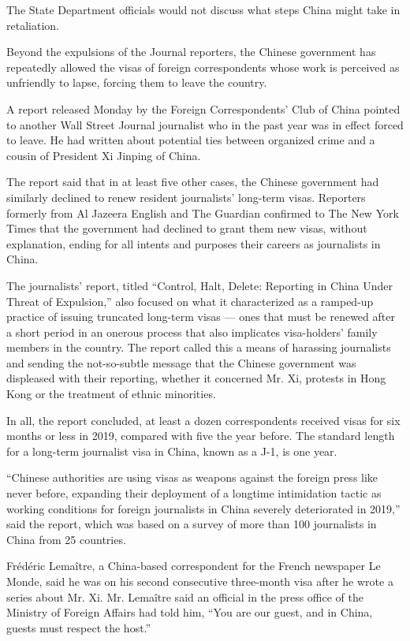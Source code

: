 The State Department officials would not discuss what steps China might
take in retaliation.

Beyond the expulsions of the Journal reporters, the Chinese government
has repeatedly allowed the visas of foreign correspondents whose work is
perceived as unfriendly to lapse, forcing them to leave the country.

A report released Monday by the Foreign Correspondents' Club of China
pointed to another Wall Street Journal journalist who in the past year
was in effect forced to leave. He had written about potential ties
between organized crime and a cousin of President Xi Jinping of China.

The report said that in at least five other cases, the Chinese
government had similarly declined to renew resident journalists'
long-term visas. Reporters formerly from Al Jazeera English and The
Guardian confirmed to The New York Times that the government had
declined to grant them new visas, without explanation, ending for all
intents and purposes their careers as journalists in China.

The journalists' report, titled ``Control, Halt, Delete: Reporting in
China Under Threat of Expulsion,'' also focused on what it characterized
as a ramped-up practice of issuing truncated long-term visas --- ones
that must be renewed after a short period in an onerous process that
also implicates visa-holders' family members in the country. The report
called this a means of harassing journalists and sending the
not-so-subtle message that the Chinese government was displeased with
their reporting, whether it concerned Mr. Xi, protests in Hong Kong or
the treatment of ethnic minorities.

In all, the report concluded, at least a dozen correspondents received
visas for six months or less in 2019, compared with five the year
before. The standard length for a long-term journalist visa in China,
known as a J-1, is one year.

``Chinese authorities are using visas as weapons against the foreign
press like never before, expanding their deployment of a longtime
intimidation tactic as working conditions for foreign journalists in
China severely deteriorated in 2019,'' said the report, which was based
on a survey of more than 100 journalists in China from 25 countries.

Frédéric Lemaître, a China-based correspondent for the French newspaper
Le Monde, said he was on his second consecutive three-month visa after
he wrote a series about Mr. Xi. Mr. Lemaître said an official in the
press office of the Ministry of Foreign Affairs had told him, ``You are
our guest, and in China, guests must respect the host.''

